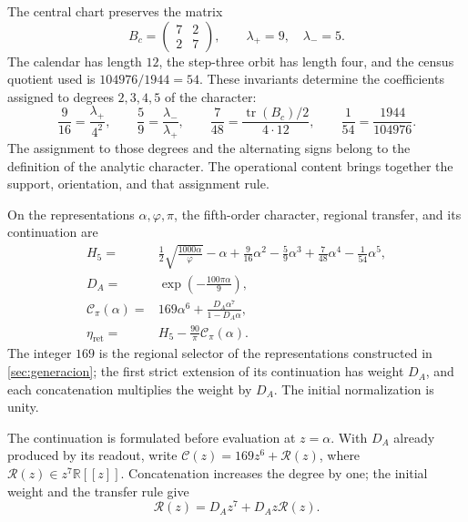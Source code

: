 The central chart preserves the matrix
\[
 B_c=\begin{pmatrix}7&2\\2&7\end{pmatrix},
 \qquad\lambda_+=9,\quad\lambda_-=5.
\]
The calendar has length \(12\), the step-three orbit has
length four, and the census quotient used is
\(104976/1944=54\). These invariants determine the coefficients
assigned to degrees \(2,3,4,5\) of the character:
\begin{equation}
 \frac9{16}=\frac{\lambda_+}{4^2},\qquad
 \frac59=\frac{\lambda_-}{\lambda_+},\qquad
 \frac7{48}=\frac{\operatorname{tr}(B_c)/2}{4\cdot12},
 \qquad
 \frac1{54}=\frac{1944}{104976}.
 \label{iv:action:coeficientes}
\end{equation}
The assignment to those degrees and the alternating signs belong
to the definition of the analytic character. The operational content
brings together the support, orientation, and that assignment rule.

\begin{definition}
\label{iv:action:lectores}
On the representations \(\alpha,\varphi,\pi\), the fifth-order
character, regional transfer, and its continuation are
\begin{align}
 H_5={}&\frac12\sqrt{\frac{1000\alpha}{\varphi}}-\alpha
       +\frac9{16}\alpha^2-\frac59\alpha^3
       +\frac7{48}\alpha^4-\frac1{54}\alpha^5,
       \label{iv:action:h5}\\
 D_A={}&\exp\!\left(-\frac{100\pi\alpha}{9}\right),
       \label{iv:action:da}\\
 \mathcal C_\pi(\alpha)={}&169\alpha^6+
       \frac{D_A\alpha^7}{1-D_A\alpha},
       \label{iv:action:cpi}\\
 \eta_{\mathrm{ret}}={}&H_5-\frac{90}{\pi}\mathcal C_\pi(\alpha).
       \label{iv:action:eta-ret}
\end{align}
The integer \(169\) is the regional selector of the representations
constructed in \ref{sec:generacion}; the first strict extension of its continuation
has weight \(D_A\), and each concatenation multiplies the weight by
\(D_A\). The initial normalization is unity.
\end{definition}

The continuation is formulated before evaluation at \(z=\alpha\).
With \(D_A\) already produced by its readout, write
\(\mathscr C(z)=169z^6+\mathscr R(z)\), where
\(\mathscr R(z)\in z^7\mathbb R[[z]]\).
Concatenation increases the degree by one; the initial weight
and the transfer rule give
\begin{equation}
 \mathscr R(z)=D_Az^7+D_Az\mathscr R(z).
 \label{iv:action:renovacion}
\end{equation}


